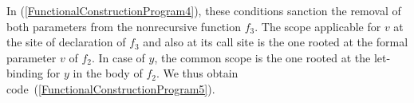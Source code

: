 In (\ref{FunctionalConstructionProgram4}), these conditions sanction
the removal of both parameters from the nonrecursive function $f_3$.
The scope applicable for $v$ at the site of declaration of $f_3$ and
also at its call site is the one rooted at the formal parameter $v$ of
$f_2$. In case of $y$, the common scope is the one rooted at the
let-binding for $y$ in the body of $f_2$. We thus obtain
code~(\ref{FunctionalConstructionProgram5}).
